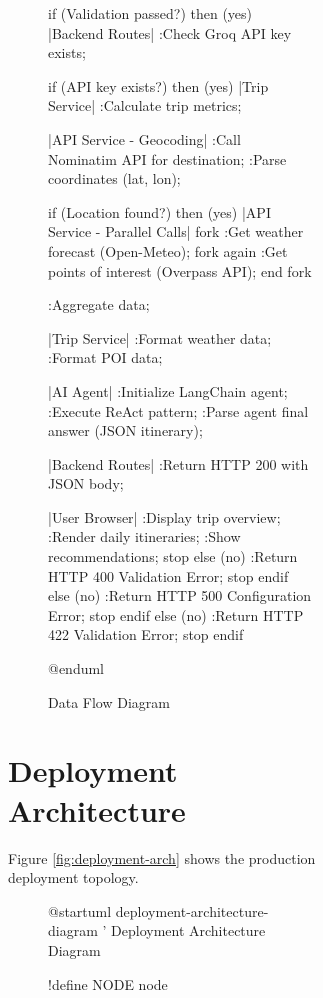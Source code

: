 \documentclass[12pt,a4paper]{report}
\begin{document}
\begin{figure}[H]
\begin{plantuml}
\begin{figure}[H]
\begin{plantuml}
\begin{figure}[H]
\begin{plantuml}
if (Validation passed?) then (yes)
    |Backend Routes|
    :Check Groq API key exists;
    
    if (API key exists?) then (yes)
        |Trip Service|
        :Calculate trip metrics;
        
        |API Service - Geocoding|
        :Call Nominatim API for destination;
        :Parse coordinates (lat, lon);
        
        if (Location found?) then (yes)
            |API Service - Parallel Calls|
            fork
                :Get weather forecast (Open-Meteo);
            fork again
                :Get points of interest (Overpass API);
            end fork
            
            :Aggregate data;
            
            |Trip Service|
            :Format weather data;
            :Format POI data;
            
            |AI Agent|
            :Initialize LangChain agent;
            :Execute ReAct pattern;
            :Parse agent final answer (JSON itinerary);
            
            |Backend Routes|
            :Return HTTP 200 with JSON body;
            
            |User Browser|
            :Display trip overview;
            :Render daily itineraries;
            :Show recommendations;
            stop
        else (no)
            :Return HTTP 400 Validation Error;
            stop
        endif
    else (no)
        :Return HTTP 500 Configuration Error;
        stop
    endif
else (no)
    :Return HTTP 422 Validation Error;
    stop
endif

@enduml
    \end{plantuml}
    \caption{Data Flow Diagram}
    \label{fig:data-flow}
\end{figure}

\section{Deployment Architecture}

Figure \ref{fig:deployment-arch} shows the production deployment topology.

\begin{figure}[H]
    \centering
    \begin{plantuml}
@startuml deployment-architecture-diagram
' Deployment Architecture Diagram

!define NODE node


\end{plantuml}
\end{figure}
\end{plantuml}
\end{figure}
\end{plantuml}
\end{figure}
\end{document}
